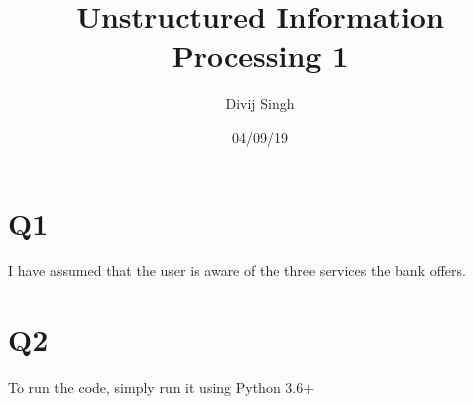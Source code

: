 \documentclass{article}
\title{Unstructured Information Processing 1}
\author{Divij Singh}
\date{04/09/19}
\begin{document}
	\maketitle
	
	\section{Q1}
I have assumed that the user is aware of the three services the bank offers.

\section{Q2}
To run the code, simply run it using Python 3.6+\\
\end{document}
